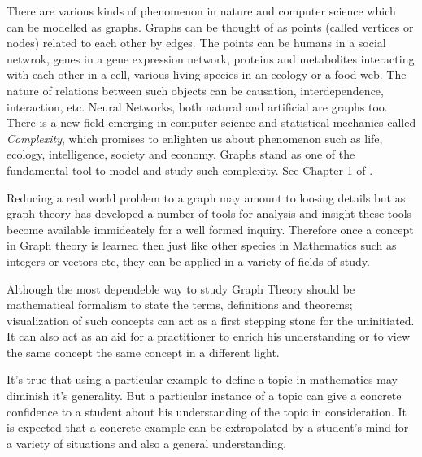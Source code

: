 
There are various kinds of phenomenon in nature and computer science which can
be modelled as graphs. Graphs can be thought of as points (called vertices or
nodes) related to each other by edges. The points can be humans in a social
netwrok, genes in a gene expression network, proteins and metabolites
interacting with each other in a cell, various living species in an ecology or
a food-web. The nature of relations between such objects can be causation,
interdependence, interaction, etc.  Neural Networks, both natural and
artificial are graphs too.  There is a new field emerging in computer science
and statistical mechanics called \emph{Complexity}, which promises to enlighten
us about phenomenon such as life, ecology, intelligence, society and economy.
Graphs stand as one of the fundamental tool to model and study such complexity.
See Chapter 1 of \cite{Gros2015}.

Reducing a real world problem to a graph may amount to loosing details but as
graph theory has developed a number of tools for analysis and insight these
tools become available immideately for a well formed inquiry. Therefore once a
concept in Graph theory is learned then just like other species in Mathematics
such as integers or vectors etc, they can be applied in a variety of fields of
study.


Although the most dependeble way to study Graph Theory should be mathematical
formalism to state the terms, definitions and theorems; visualization of such
concepts can act as a first stepping stone for the uninitiated. It can also act
as an aid for a practitioner to enrich his understanding or to view the same
concept the same concept in a different light.

It's true that using a particular example to define a topic in mathematics may
diminish it's generality. But a particular instance of a topic can give a
concrete confidence to a student about his understanding of the topic in
consideration. It is expected that a concrete example can be extrapolated by a
student's mind for a variety of situations and also a general understanding.





% 


%
